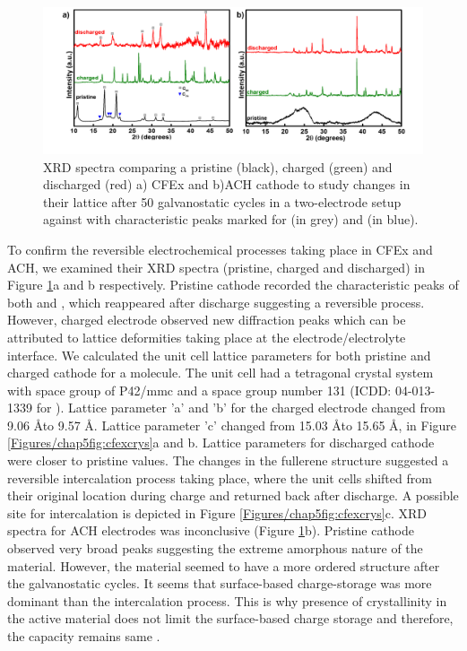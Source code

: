 \begin{figure}[tbh!]
  \centering
  \includegraphics[width=\textwidth]{Figures/chap5fig/xrd}
    \caption{XRD spectra comparing a pristine (black), charged (green) and discharged (red) a) CFEx and b)ACH cathode to study changes in their lattice after 50 galvanostatic cycles in a two-electrode setup against  with characteristic peaks marked for  (in grey) and  (in blue).}
  \label{Figures/chap5fig:xrd}
\end{figure}
To confirm the reversible electrochemical processes taking place in CFEx and ACH, we examined their XRD spectra (pristine, charged and discharged) in Figure \ref{Figures/chap5fig:xrd}a and b respectively. Pristine cathode recorded the characteristic peaks of both  and , which reappeared after discharge suggesting a reversible process. However, charged electrode observed new diffraction peaks which can be attributed to lattice deformities taking place at the electrode/electrolyte interface. We calculated the unit cell lattice parameters for both pristine and charged cathode for a  molecule. The unit cell had a tetragonal crystal system with space group of P42/mmc and a space group number 131 (ICDD: 04-013-1339 for ). Lattice parameter 'a' and 'b' for the charged electrode changed from 9.06 \AA to 9.57 \AA . Lattice parameter 'c' changed from 15.03 \AA to 15.65 \AA, in Figure \ref{Figures/chap5fig:cfexcrys}a and b. Lattice parameters for discharged cathode were closer to pristine values. The changes in the fullerene structure suggested a reversible intercalation process taking place, where the unit cells shifted from their original location during charge and returned back after discharge. A possible site for  intercalation is depicted in Figure \ref{Figures/chap5fig:cfexcrys}c. XRD spectra for ACH electrodes was inconclusive (Figure \ref{Figures/chap5fig:xrd}b). Pristine cathode observed very broad peaks suggesting the extreme amorphous nature of the material. However, the material seemed to have a more ordered structure after the galvanostatic cycles. It seems that surface-based charge-storage was more dominant than the intercalation process. This is why presence of crystallinity in the active material does not limit the surface-based charge storage and therefore, the capacity remains same \cite{kim_synthesis_2006, jow_factors_2018}. 
